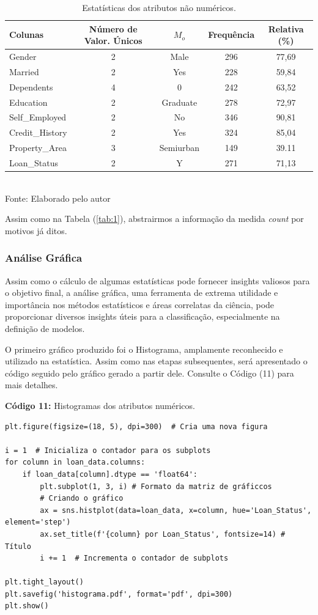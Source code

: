 \documentclass[a4paper,12pt]{article} %
\begin{document}
\begin{table}[H]
    \centering
    \caption{Estatísticas dos atributos não numéricos.}
    \begin{tabular}{lcccc} \\ \hline
       Colunas & Número de Valor. Únicos & $M_o$ & Frequência & Relativa (\%) \\ \hline
       Gender & 2 & Male & 296 & 77,69  \\
       Married & 2 & Yes & 228 & 59,84 \\
       Dependents & 4 & 0 & 242 & 63,52 \\
       Education & 2 & Graduate & 278 & 72,97 \\
       Self\_Employed & 2 & No & 346 & 90,81 \\
       Credit\_History & 2 & Yes & 324 & 85,04 \\
       Property\_Area & 3 & Semiurban & 149 & 39.11 \\
       Loan\_Status & 2 & Y & 271 & 71,13 \\ \hline\hline
    \end{tabular} \\
    Fonte: Elaborado pelo autor
    \label{tab:2}
\end{table}

Assim como na Tabela (\ref{tab:1}), abstrairmos a informação da medida \textit{count} por motivos já ditos.

\subsubsection{Análise Gráfica}
Assim como o cálculo de algumas estatísticas pode fornecer insights valiosos para o objetivo final, a análise gráfica, uma ferramenta de extrema utilidade e importância nos métodos estatísticos e áreas correlatas da ciência, pode proporcionar diversos insights úteis para a classificação, especialmente na definição de modelos.

O primeiro gráfico produzido foi o Histograma, amplamente reconhecido e utilizado na estatística. Assim como nas etapas subsequentes, será apresentado o código seguido pelo gráfico gerado a partir dele. Consulte o Código (11) para mais detalhes.
\begin{center}
\textbf{Código 11:} Histogramas dos atributos numéricos.
\begin{verbatim}
plt.figure(figsize=(18, 5), dpi=300)  # Cria uma nova figura

i = 1  # Inicializa o contador para os subplots
for column in loan_data.columns:
    if loan_data[column].dtype == 'float64':
        plt.subplot(1, 3, i) # Formato da matriz de gráficcos
        # Criando o gráfico
        ax = sns.histplot(data=loan_data, x=column, hue='Loan_Status', element='step')
        ax.set_title(f'{column} por Loan_Status', fontsize=14) # Título
        i += 1  # Incrementa o contador de subplots

plt.tight_layout()
plt.savefig('histograma.pdf', format='pdf', dpi=300)
plt.show()
\end{verbatim}
\end{center}
\end{document}
